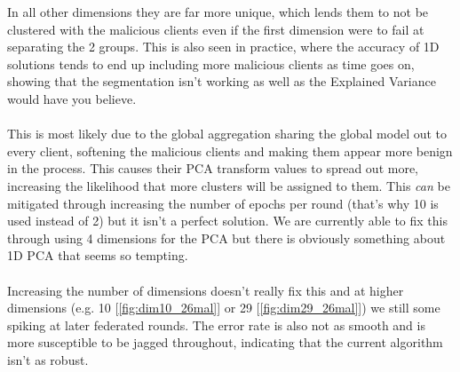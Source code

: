 In all other dimensions they are far more unique, which lends them to not be clustered with the malicious clients even if the first dimension were to fail at separating the 2 groups.
This is also seen in practice, where the accuracy of 1D solutions tends to end up including more malicious clients as time goes on, showing that the segmentation isn't working as well as the Explained Variance would have you believe.
\\ \\
This is most likely due to the global aggregation sharing the global model out to every client, softening the malicious clients and making them appear more benign in the process.
This causes their PCA transform values to spread out more, increasing the likelihood that more clusters will be assigned to them.
This \textit{can} be mitigated through increasing the number of epochs per round (that's why 10 is used instead of 2) but it isn't a perfect solution.
We are currently able to fix this through using 4 dimensions for the PCA but there is obviously something about 1D PCA that seems so tempting.
\\ \\
Increasing the number of dimensions doesn't really fix this and at higher dimensions (e.g. 10 [\ref{fig:dim10_26mal}] or 29 [\ref{fig:dim29_26mal}]) we still some spiking at later federated rounds.
The error rate is also not as smooth and is more susceptible to be jagged throughout, indicating that the current algorithm isn't as robust.



